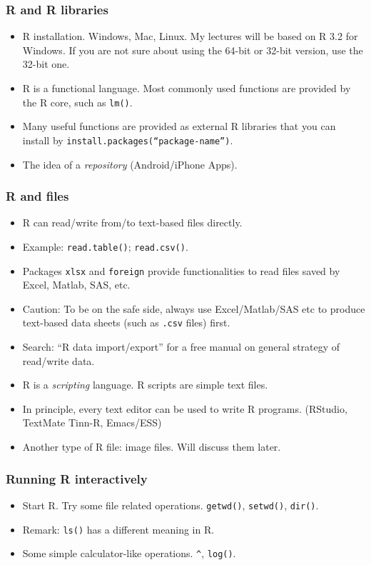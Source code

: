 \begin{frame}
  \frametitle{R and R libraries}
  \begin{itemize}
  \item R installation.  Windows, Mac, Linux.  My lectures will be
    based on R 3.2 for Windows. If you are not sure about using the
    64-bit or 32-bit version, use the 32-bit one.
  \item R is a functional language. Most commonly used functions are
    provided by the R core, such as \texttt{lm()}.
  \item Many useful functions are provided as external R libraries
    that you can install by
    \texttt{install.packages(``package-name'')}.
  \item The idea of a \emph{repository} (Android/iPhone Apps).
  \end{itemize}
\end{frame}

\begin{frame}
  \frametitle{R and files}
  \begin{itemize}
  \item R can read/write from/to text-based files directly.
  \item Example: \texttt{read.table()}; \texttt{read.csv()}.
  \item Packages \texttt{xlsx} and \texttt{foreign} provide
    functionalities to read files saved by Excel, Matlab, SAS, etc.
  \item Caution: To be on the safe side, always use Excel/Matlab/SAS
    etc to produce text-based data sheets (such as \texttt{.csv}
    files) first.
  \item Search: ``R data import/export'' for a free manual on general
    strategy of read/write data.
  \item R is a \emph{scripting} language. R scripts are simple text
    files.
  \item In principle, every text editor can be used to write R
    programs. (RStudio, TextMate Tinn-R, Emacs/ESS)
  \item Another type of R file: image files. Will discuss them later.
  \end{itemize}
\end{frame}

\begin{frame}
  \frametitle{Running R interactively}
  \begin{itemize}
  \item Start R.  Try some file related operations. \texttt{getwd()},
    \texttt{setwd()}, \texttt{dir()}.
  \item Remark: \texttt{ls()} has a different meaning in R.
  \item Some simple calculator-like operations. \texttt{\^},
    \texttt{log()}.
  \end{itemize}
\end{frame}

